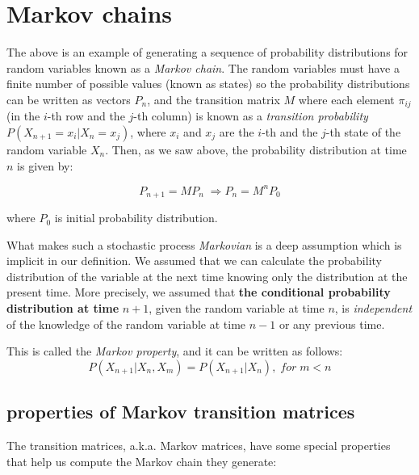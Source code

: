 \documentclass[
  letterpaper,
  DIV=11,
  numbers=noendperiod]{scrreprt}
\begin{document}
\section{Markov chains}\label{markov-chains}

The above is an example of generating a sequence of probability
distributions for random variables known as a \emph{Markov chain}. The
random variables must have a finite number of possible values (known as
states) so the probability distributions can be written as vectors
\(P_n\), and the transition matrix \(M\) where each element \(\pi_{ij}\)
(in the \(i\)-th row and the \(j\)-th column) is known as a
\emph{transition probability} \(P(X_{n+1} = x_i | X_n = x_j)\), where
\(x_i\) and \(x_j\) are the \(i\)-th and the \(j\)-th state of the
random variable \(X_n\). Then, as we saw above, the probability
distribution at time \(n\) is given by:

\[ 
P_{n+1} = MP_n \; \Longrightarrow P_{n} = M^nP_0
\]

where \(P_0\) is initial probability distribution.

What makes such a stochastic process \emph{Markovian} is a deep
assumption which is implicit in our definition. We assumed that we can
calculate the probability distribution of the variable at the next time
knowing only the distribution at the present time. More precisely, we
assumed that \textbf{the conditional probability distribution at time}
\(n+1\), given the random variable at time \(n\), is \emph{independent}
of the knowledge of the random variable at time \(n-1\) or any previous
time.

This is called the \emph{Markov property}, and it can be written as
follows: \[
P(X_{n+1} | X_{n} , X_{m}) = P(X_{n+1} | X_{n}),  \; for \;  m<n 
\]

\subsection{properties of Markov transition
matrices}\label{properties-of-markov-transition-matrices}

The transition matrices, a.k.a. Markov matrices, have some special
properties that help us compute the Markov chain they generate:
\end{document}
